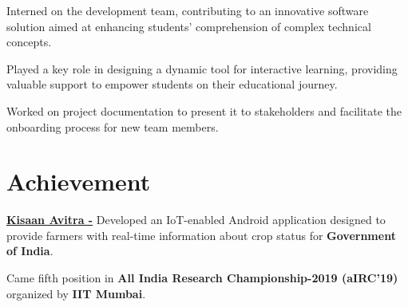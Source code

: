 \documentclass[]{deedy-resume-openfont}
\begin{document}
\begin{minipage}[t]{0.66\textwidth}
\begin{tightemize}
\item Interned on the development team, contributing to an innovative software solution aimed at enhancing students' comprehension of complex technical concepts.
\item Played a key role in designing a dynamic tool for interactive learning, providing valuable support to empower students on their educational journey.
\item Worked on project documentation to present it to stakeholders and facilitate the onboarding process for new team members.
\end{tightemize}
\sectionsep


\section{Achievement }
\textbf{\href{http://www.cs.cornell.edu/~ashesh/}{Kisaan Avitra -}}  Developed an IoT-enabled Android application designed to provide farmers with real-time information about crop status for \textbf{Government of India}. 
\sectionsep

Came fifth position in \textbf{All India Research Championship-2019 (aIRC’19) }organized by \textbf{IIT Mumbai}.  
\sectionsep

\end{minipage} 
\end{document}

